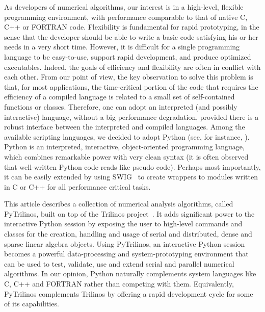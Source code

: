 \documentclass[10pt,relax]{SANDreport}
\newcommand{\PyTrilinos}{{PyTrilinos}}
\begin{document}
As developers of numerical algorithms, our interest is in a
high-level, flexible programming environment, with performance
comparable to that of native C, C++ or FORTRAN code. Flexibility is
fundamental for rapid prototyping, in the sense that the developer
should be able to write a basic code satisfying his or her needs in
a very short time.  However, it is difficult for a single
programming language to be easy-to-use, support rapid development,
and produce optimized executables. Indeed, the goals of efficiency
and flexibility are often in conflict with each other. From our
point of view, the key observation to solve this problem is that,
for most applications, the time-critical portion of the code that
requires the efficiency of a compiled language is related to a small
set of self-contained functions or classes. Therefore, one can adopt
an interpreted (and possibly interactive) language, without a big
performance degradation, provided there is a robust interface
between the interpreted and compiled languages. Among the available
scripting languages, we decided to adopt Python (see, for instance,
\cite{python-book}).  Python is an interpreted, interactive,
object-oriented programming language, which combines remarkable
power with very clean syntax (it is often observed that well-written
Python code reads like pseudo code).  Perhaps most importantly, it
can be easily extended by using SWIG~\cite{swig} to create wrappers
to modules written in C or C++ for all performance critical tasks.

This article describes a collection of numerical analysis
algorithms, called PyTrilinos, built on top of the Trilinos
project~\cite{Trilinos-home-page,Heroux:2005:OTP}.  It adds
significant power to the interactive Python session by exposing the
user to high-level commands and classes for the creation, handling
and usage of serial and distributed, dense and sparse linear algebra
objects. Using \PyTrilinos, an interactive Python session becomes a
powerful data-processing and system-prototyping environment that can
be used to test, validate, use and extend serial and parallel
numerical algorithms. In our opinion, Python naturally complements
system languages like C, C++ and FORTRAN rather than competing with
them. Equivalently, PyTrilinos complements Trilinos by offering a
rapid development cycle for some of its capabilities.

\end{document}
